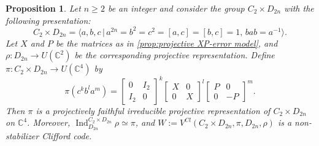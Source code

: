 \documentclass[11pt, oneside, reqno]{amsart}
\newcommand{\bbC}{\mathbb{C}}
\newcommand{\Ind}{\operatorname{Ind}}
\theoremstyle{definition}
\theoremstyle{plain}
\newtheorem{proposition}[definition]{Proposition}
\theoremstyle{remark}
\begin{document}
\begin{proposition}\label{prop:smallest non-stabilizer Clifford code}
    Let $n \geq 2$ be an integer and consider the group $C_2 \times D_{2n}$ with the following presentation:
    \begin{equation*}
        C_2 \times D_{2n} = \langle a, b, c \, \vert \, a^{2n} = b^2 = c^2 = [a,c] = [b,c] = 1, \, bab = a^{-1} \rangle.
    \end{equation*}
    Let $X$ and $P$ be the matrices as in \cref{prop:projective XP-error model}, and $\rho \colon D_{2n} \to U(\bbC^2)$ be the corresponding projective representation. Define $\pi \colon C_2 \times D_{2n} \to U(\bbC^4)$ by
    \begin{equation*}
        \pi(c^kb^la^m) =
        \begin{bmatrix}
            0 & I_2 \\
            I_2 & 0
        \end{bmatrix}^k
        \begin{bmatrix}
            X & 0 \\
            0 & X
        \end{bmatrix}^l
        \begin{bmatrix}
            P & 0 \\
            0 & -P
        \end{bmatrix}^m.
    \end{equation*}
    Then $\pi$ is a projectively faithful irreducible projective representation of $C_2 \times D_{2n}$ on $\bbC^4$. Moreover, $\Ind_{D_{2n}}^{C_2 \times D_{2n}} \rho \simeq \pi$, and $W := V^{Cl}(C_2 \times D_{2n}, \pi, D_{2n}, \rho)$ is a non-stabilizer Clifford code.
\end{proposition}
\end{document}
